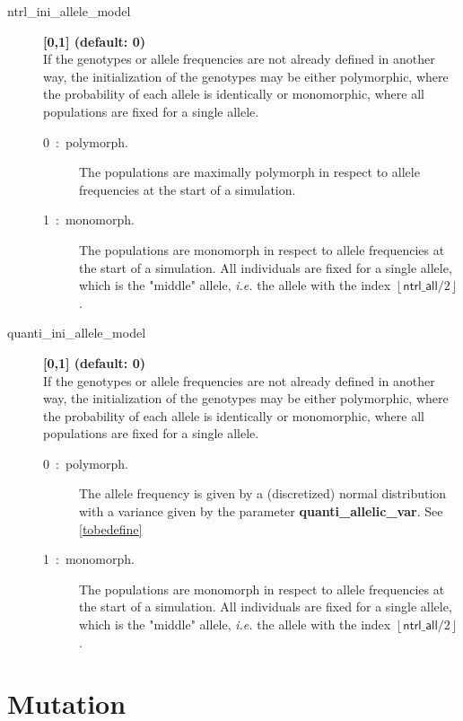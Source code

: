 \documentclass[letterpaper,12pt,oneside]{book}
\begin{document}
\begin{description}
\item[ntrl\_ini\_allele\_model] \textbf{[0,1] (default: 0)}\\
If the genotypes or allele frequencies are not already defined in another way, the initialization of the genotypes may be either polymorphic, where the probability of each allele is identically or monomorphic, where all populations are fixed for a single allele.   
\begin{description}
\item[0~:~polymorph.] The populations are maximally polymorph in respect to allele frequencies at the start of a simulation.
\item[1~:~monomorph.] The populations are monomorph in respect to allele frequencies at the start of a simulation. All individuals are fixed for a single allele, which is  the "middle" allele, \textit{i.e.} the allele with the index $\left\lfloor \textsf{ntrl\_all}/2\right\rfloor$.
\end{description}
\item[quanti\_ini\_allele\_model] \textbf{[0,1] (default: 0)}\\
If the genotypes or allele frequencies are not already defined in another way, the initialization of the genotypes may be either polymorphic, where the probability of each allele is identically or monomorphic, where all populations are fixed for a single allele.   
\begin{description}
\item[0~:~polymorph.] The allele frequency is given by a (discretized) normal distribution with a variance given by the parameter \textbf{quanti\_allelic\_var}. See \ref{tobedefine}
\item[1~:~monomorph.] The populations are monomorph in respect to allele frequencies at the start of a simulation. All individuals are fixed for a single allele, which is  the "middle" allele, \textit{i.e.} the allele with the index $\left\lfloor \textsf{ntrl\_all}/2\right\rfloor$.
\end{description}
\end{description}

\section{Mutation}
\end{document}
